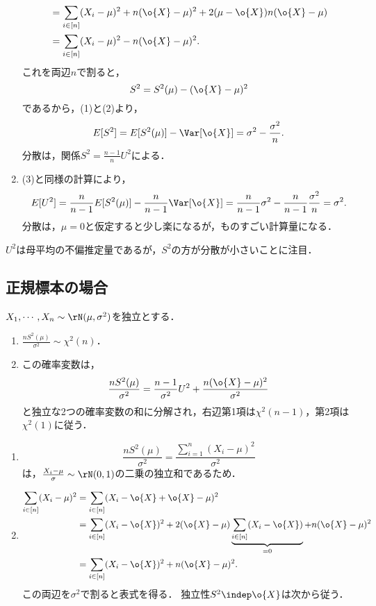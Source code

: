 \documentclass[uplatex,dvipdfmx]{jsreport}
\begin{document}
\begin{Proof}
\begin{enumerate}
\begin{align*}
            &=\sum_{i\in[n]}(X_i-\mu)^2+n(\o{X}-\mu)^2+2(\mu-\o{X})n(\o{X}-\mu)\\
            &=\sum_{i\in[n]}(X_i-\mu)^2-n(\o{X}-\mu)^2.
        \end{align*}
        これを両辺$n$で割ると，
        \[S^2=S^2(\mu)-(\o{X}-\mu)^2\]
        であるから，(1)と(2)より，
        \[E[S^2]=E[S^2(\mu)]-\Var[\o{X}]=\sigma^2-\frac{\sigma^2}{n}.\]
        分散は，関係$S^2=\frac{n-1}{n}U^2$による．
        \item (3)と同様の計算により，
        \[E[U^2]=\frac{n}{n-1}E[S^2(\mu)]-\frac{n}{n-1}\Var[\o{X}]=\frac{n}{n-1}\sigma^2-\frac{n}{n-1}\frac{\sigma^2}{n}=\sigma^2.\]
        分散は，$\mu=0$と仮定すると少し楽になるが，ものすごい計算量になる．
    \end{enumerate}
\end{Proof}
\begin{remarks}
    $U^2$は母平均の不偏推定量であるが，$S^2$の方が分散が小さいことに注目．
\end{remarks}

\subsection{正規標本の場合}

\begin{proposition}
    $X_1,\cdots,X_n\sim\rN(\mu,\sigma^2)$を独立とする．
    \begin{enumerate}
        \item $\frac{nS^2(\mu)}{\sigma^2}\sim\chi^2(n)$．
        \item この確率変数は，
        \[\frac{nS^2(\mu)}{\sigma^2}=\frac{n-1}{\sigma^2}U^2+\frac{n(\o{X}-\mu)^2}{\sigma^2}\]
        と独立な2つの確率変数の和に分解され，右辺第1項は$\chi^2(n-1)$，第2項は$\chi^2(1)$に従う．
    \end{enumerate}
\end{proposition}
\begin{Proof}\mbox{}
    \begin{enumerate}
        \item \[\frac{nS^2(\mu)}{\sigma^2}=\frac{\sum_{i=1}^n(X_i-\mu)^2}{\sigma^2}\]
        は，$\frac{X_i-\mu}{\sigma}\sim\rN(0,1)$の二乗の独立和であるため．
        \item \begin{align*}
            \sum_{i\in[n]}(X_i-\mu)^2&=\sum_{i\in[n]}(X_i-\o{X}+\o{X}-\mu)^2\\
            &=\sum_{i\in[n]}(X_i-\o{X})^2+2(\o{X}-\mu)\underbrace{\sum_{i\in[n]}(X_i-\o{X})}_{=0}+n(\o{X}-\mu)^2\\
            &=\sum_{i\in[n]}(X_i-\o{X})^2+n(\o{X}-\mu)^2.
        \end{align*}
        この両辺を$\sigma^2$で割ると表式を得る．
        独立性$S^2\indep\o{X}$は次から従う．
    \end{enumerate}
\end{Proof}
\end{document}
